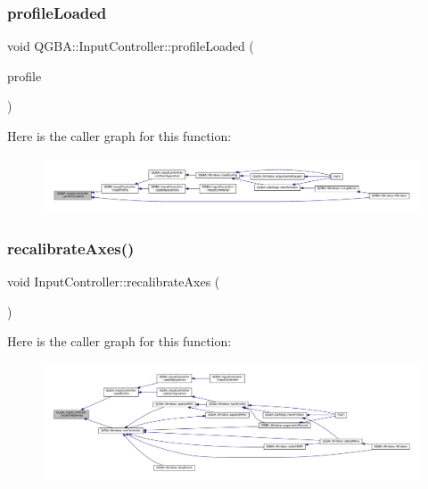 \subsubsection{\texorpdfstring{profile\+Loaded}{profileLoaded}}
{\footnotesize\ttfamily void Q\+G\+B\+A\+::\+Input\+Controller\+::profile\+Loaded (\begin{DoxyParamCaption}\item[{const Q\+String \&}]{profile }\end{DoxyParamCaption})\hspace{0.3cm}{\ttfamily [signal]}}

Here is the caller graph for this function\+:
\nopagebreak
\begin{figure}[H]
\begin{center}
\leavevmode
\includegraphics[width=350pt]{class_q_g_b_a_1_1_input_controller_aa71a637cb3965c09bde7ac6e2b562365_icgraph}
\end{center}
\end{figure}
\mbox{\label{class_q_g_b_a_1_1_input_controller_af7d2e32ac417a33b5eed9bf861d5b54f}} 
\subsubsection{\texorpdfstring{recalibrate\+Axes()}{recalibrateAxes()}}
{\footnotesize\ttfamily void Input\+Controller\+::recalibrate\+Axes (\begin{DoxyParamCaption}{ }\end{DoxyParamCaption})}

Here is the caller graph for this function\+:
\nopagebreak
\begin{figure}[H]
\begin{center}
\leavevmode
\includegraphics[width=350pt]{class_q_g_b_a_1_1_input_controller_af7d2e32ac417a33b5eed9bf861d5b54f_icgraph}
\end{center}
\end{figure}
\mbox{\label{class_q_g_b_a_1_1_input_controller_a99f4ccb37018985d45dcf79204cd3131}} 
